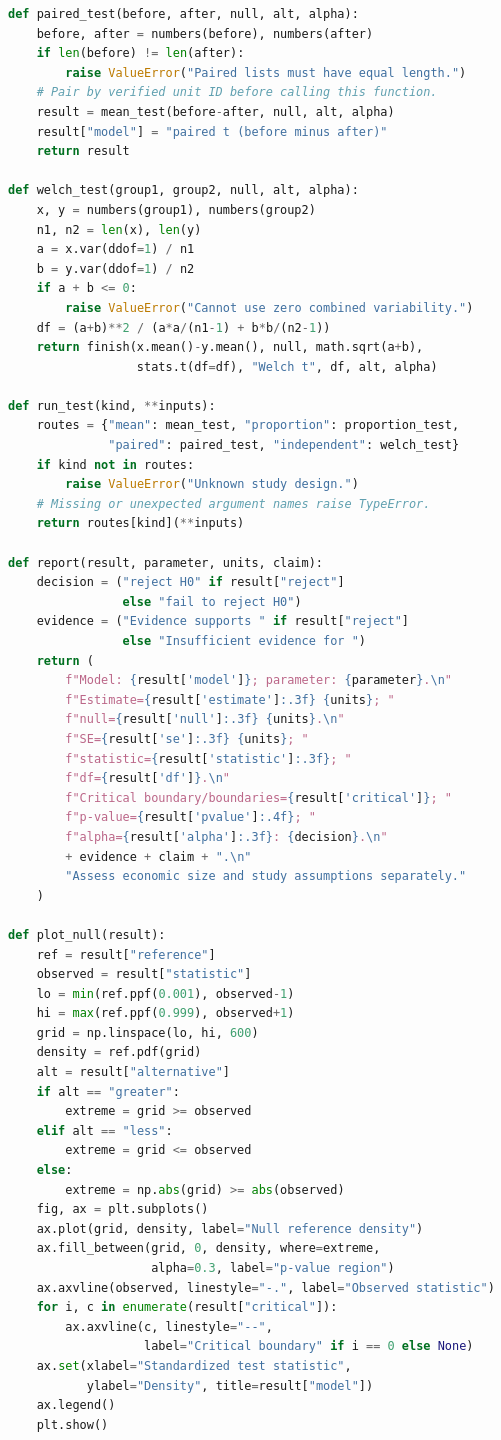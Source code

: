 \begin{lstlisting}[language=Python,basicstyle=\ttfamily\small,breaklines=true,columns=fullflexible,keepspaces=true]
def paired_test(before, after, null, alt, alpha):
    before, after = numbers(before), numbers(after)
    if len(before) != len(after):
        raise ValueError("Paired lists must have equal length.")
    # Pair by verified unit ID before calling this function.
    result = mean_test(before-after, null, alt, alpha)
    result["model"] = "paired t (before minus after)"
    return result

def welch_test(group1, group2, null, alt, alpha):
    x, y = numbers(group1), numbers(group2)
    n1, n2 = len(x), len(y)
    a = x.var(ddof=1) / n1
    b = y.var(ddof=1) / n2
    if a + b <= 0:
        raise ValueError("Cannot use zero combined variability.")
    df = (a+b)**2 / (a*a/(n1-1) + b*b/(n2-1))
    return finish(x.mean()-y.mean(), null, math.sqrt(a+b),
                  stats.t(df=df), "Welch t", df, alt, alpha)

def run_test(kind, **inputs):
    routes = {"mean": mean_test, "proportion": proportion_test,
              "paired": paired_test, "independent": welch_test}
    if kind not in routes:
        raise ValueError("Unknown study design.")
    # Missing or unexpected argument names raise TypeError.
    return routes[kind](**inputs)

def report(result, parameter, units, claim):
    decision = ("reject H0" if result["reject"]
                else "fail to reject H0")
    evidence = ("Evidence supports " if result["reject"]
                else "Insufficient evidence for ")
    return (
        f"Model: {result['model']}; parameter: {parameter}.\n"
        f"Estimate={result['estimate']:.3f} {units}; "
        f"null={result['null']:.3f} {units}.\n"
        f"SE={result['se']:.3f} {units}; "
        f"statistic={result['statistic']:.3f}; "
        f"df={result['df']}.\n"
        f"Critical boundary/boundaries={result['critical']}; "
        f"p-value={result['pvalue']:.4f}; "
        f"alpha={result['alpha']:.3f}: {decision}.\n"
        + evidence + claim + ".\n"
        "Assess economic size and study assumptions separately."
    )

def plot_null(result):
    ref = result["reference"]
    observed = result["statistic"]
    lo = min(ref.ppf(0.001), observed-1)
    hi = max(ref.ppf(0.999), observed+1)
    grid = np.linspace(lo, hi, 600)
    density = ref.pdf(grid)
    alt = result["alternative"]
    if alt == "greater":
        extreme = grid >= observed
    elif alt == "less":
        extreme = grid <= observed
    else:
        extreme = np.abs(grid) >= abs(observed)
    fig, ax = plt.subplots()
    ax.plot(grid, density, label="Null reference density")
    ax.fill_between(grid, 0, density, where=extreme,
                    alpha=0.3, label="p-value region")
    ax.axvline(observed, linestyle="-.", label="Observed statistic")
    for i, c in enumerate(result["critical"]):
        ax.axvline(c, linestyle="--",
                   label="Critical boundary" if i == 0 else None)
    ax.set(xlabel="Standardized test statistic",
           ylabel="Density", title=result["model"])
    ax.legend()
    plt.show()


\end{lstlisting}
